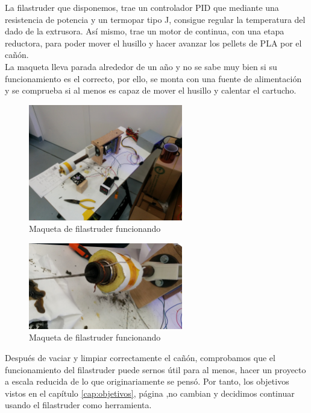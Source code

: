 La filastruder que disponemos, trae un controlador PID que mediante una resistencia de potencia y un termopar tipo J, consigue regular la temperatura del dado de la extrusora. Así mismo, trae un motor de continua, con una etapa reductora, para poder mover el husillo y hacer avanzar los pellets de PLA por el cañón.\\

La maqueta lleva parada alrededor de un año y no se sabe muy bien si su funcionamiento es el correcto, por ello, se monta con una fuente de alimentación y se comprueba si al menos es capaz de mover el husillo y calentar el cartucho.\\

	\begin{figure}[H]
            \centering
            \includegraphics[width=0.6\textwidth]{images/filaextruder/IMG_20150225_093400.jpg}
            \caption{Maqueta de filastruder funcionando}
            \label{fig:hardware_filastruder2}
    \end{figure}
    	\begin{figure}[H]
            \centering
            \includegraphics[width=0.6\textwidth]{images/filaextruder/IMG_20150225_124525.jpg}
            \caption{Maqueta de filastruder funcionando}
            \label{fig:hardware_filastruder3}
    \end{figure}

Después de vaciar y limpiar correctamente el cañón, comprobamos que el funcionamiento del filastruder puede sernos útil para al menos, hacer un proyecto a escala reducida de lo que originariamente se pensó. Por tanto, los objetivos vistos en el capítulo \ref{cap:objetivos}, página \pageref{cap:objetivos},no cambian y decidimos continuar usando el filastruder como herramienta.\\

